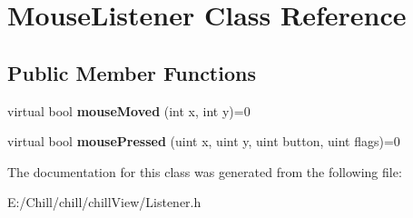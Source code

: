 \hypertarget{class_mouse_listener}{}\section{Mouse\+Listener Class Reference}
\label{class_mouse_listener}
\subsection*{Public Member Functions}
\begin{DoxyCompactItemize}
\item 
\mbox{\label{class_mouse_listener_adce52009226be1020de216658339e8eb}} 
virtual bool {\bfseries mouse\+Moved} (int x, int y)=0
\item 
\mbox{\label{class_mouse_listener_a6cc7547acf736e2f5cefc83f946f8c4b}} 
virtual bool {\bfseries mouse\+Pressed} (uint x, uint y, uint button, uint flags)=0
\end{DoxyCompactItemize}


The documentation for this class was generated from the following file\+:\begin{DoxyCompactItemize}
\item 
E\+:/\+Chill/chill/chill\+View/Listener.\+h\end{DoxyCompactItemize}

